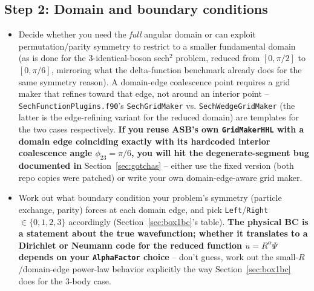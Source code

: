 \documentclass[11pt]{article}
\newcommand{\file}[1]{\texttt{#1}}
\newcommand{\sub}[1]{\texttt{#1}}
\begin{document}
\subsection*{Step 2: Domain and boundary conditions}
\begin{itemize}
\item Decide whether you need the \emph{full} angular domain or can exploit permutation/parity
  symmetry to restrict to a smaller fundamental domain (as is done for the
  3-identical-boson sech$^2$ problem, reduced from $[0,\pi/2]$ to $[0,\pi/6]$, mirroring what the
  delta-function benchmark already does for the same symmetry reason). A domain-edge coalescence
  point requires a grid maker that refines toward that edge, not around an interior point --
  \file{SechFunctionPlugins.f90}'s \sub{SechGridMaker} vs. \sub{SechWedgeGridMaker} (the latter is
  the edge-refining variant for the reduced domain) are templates
  for the two cases respectively. \textbf{If you reuse ASB's own \sub{GridMakerHHL} with a domain
  edge coinciding exactly with its hardcoded interior coalescence angle $\phi_{23}=\pi/6$, you
  will hit the degenerate-segment bug documented in} Section~\ref{sec:gotchas} --
  either use the fixed version (both repo copies were patched) or write your own domain-edge-aware
  grid maker.
\item Work out what boundary condition your problem's symmetry (particle exchange, parity) forces
  at each domain edge, and pick \texttt{Left}/\texttt{Right} $\in\{0,1,2,3\}$ accordingly
  (Section~\ref{sec:box1bc}'s table). \textbf{The physical BC is a statement about the true
  wavefunction; whether it translates to a Dirichlet or Neumann code for the reduced function
  $u=R^\alpha\Psi$ depends on your \texttt{AlphaFactor} choice} -- don't guess, work out the
  small-$R$/domain-edge power-law behavior explicitly the way Section~\ref{sec:box1bc} does for
  the 3-body case.
\end{itemize}
\end{document}
